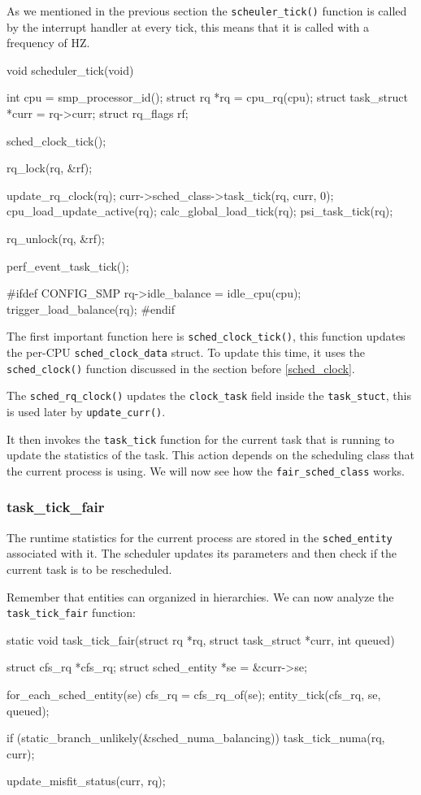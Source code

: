 As we mentioned in the previous section the \verb|scheuler_tick()|  function is called by the interrupt handler at every tick, this means that it is called with a frequency of HZ.

\begin{code}
void scheduler_tick(void)
{
	int cpu = smp_processor_id();
	struct rq *rq = cpu_rq(cpu);
	struct task_struct *curr = rq->curr;
	struct rq_flags rf;

	sched_clock_tick();

	rq_lock(rq, &rf);

	update_rq_clock(rq);
	curr->sched_class->task_tick(rq, curr, 0);
	cpu_load_update_active(rq);
	calc_global_load_tick(rq);
	psi_task_tick(rq);

	rq_unlock(rq, &rf);

	perf_event_task_tick();

#ifdef CONFIG_SMP
	rq->idle_balance = idle_cpu(cpu);
	trigger_load_balance(rq);
#endif
}
\end{code}

The first important function here is \verb|sched_clock_tick()|, this function updates the per-CPU \verb|sched_clock_data| struct. To update this time, it uses the \verb|sched_clock()| function discussed in the section before \ref{sched_clock}.

The \verb|sched_rq_clock()| updates the \verb|clock_task| field inside the \verb|task_stuct|, this is used later by \verb|update_curr()|.

It then invokes the \verb|task_tick| function for the current task that is running to update the statistics of the task. This action depends on the scheduling class that the current process is using. We will now see how the \verb|fair_sched_class| works.

\subsubsection{task\_tick\_fair}

The runtime statistics for the current process are stored in the \verb|sched_entity| associated with it. The scheduler updates its parameters and then check if the current task is to be rescheduled. 

Remember that entities can organized in hierarchies.
We can now analyze the \verb|task_tick_fair| function:
\begin{code}
static void task_tick_fair(struct rq *rq, struct task_struct *curr, int queued)
{
	struct cfs_rq *cfs_rq;
	struct sched_entity *se = &curr->se;

	for_each_sched_entity(se) {
		cfs_rq = cfs_rq_of(se);
		entity_tick(cfs_rq, se, queued);
	}

	if (static_branch_unlikely(&sched_numa_balancing))
		task_tick_numa(rq, curr);

	update_misfit_status(curr, rq);
}
\end{code}

